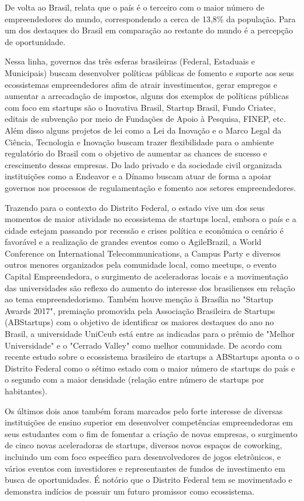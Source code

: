 De volta ao Brasil,  relata que o país é o terceiro com o maior número de empreendedores do mundo, correspondendo a cerca de 13,8\% da população. Para  um dos destaques do Brasil em comparação ao restante do mundo é a percepção de oportunidade.

Nessa linha, governos das três esferas brasileiras (Federal, Estaduais e Municipais) buscam desenvolver políticas públicas de fomento e suporte aos seus ecossistemas empreendedores afim de atrair investimentos, gerar empregos e aumentar a arrecadação de impostos, alguns dos exemplos de políticas públicas com foco em startups são o Inovativa Brasil, Startup Brasil, Fundo Criatec, editais de subvenção por meio de Fundações de Apoio à Pesquisa, FINEP, etc. Além disso alguns projetos de lei como a Lei da Inovação e o Marco Legal da Ciência, Tecnologia e Inovação buscam trazer flexibilidade para o ambiente regulatório do Brasil com o objetivo de aumentar as chances de sucesso e crescimento dessas empresas. Do lado privado e da sociedade civil organizada instituições como a Endeavor e a Dínamo buscam atuar de forma a apoiar governos nos processos de regulamentação e fomento aos setores empreendedores.

Trazendo para o contexto do Distrito Federal, o estado vive um dos seus momentos de maior atividade no ecossistema de startups local, embora o país e a cidade estejam passando por recessão e crises política e econômica o cenário é favorável e a realização de grandes eventos como o AgileBrazil, a World Conference on International Telecommunications, a Campus Party e diversos outros menores organizados pela comunidade local, como meetups, o evento Capital Empreendedora, o surgimento de aceleradoras locais e a movimentação das universidades são reflexo do aumento do interesse dos brasilienses em relação ao tema empreendedorismo. Também houve menção à Brasília no "Startup Awards 2017", premiação promovida pela Associação Brasileira de Startups (ABStartups) com o objetivo de identificar os maiores destaques do ano no Brasil, a universidade UniCeub está entre as indicadas para o prêmio de "Melhor Universidade" e o "Cerrado Valley" como melhor comunidade. De acordo com recente estudo sobre o ecossistema brasileiro de startups a ABStartups  aponta o o Distrito Federal como o sétimo estado com o maior número de startups do país e o segundo com a maior densidade (relação entre número de startups por habitantes). 

Os últimos dois anos também foram marcados pelo forte interesse de diversas instituições de ensino superior em desenvolver competências empreendedoras em seus estudantes com o fim de fomentar a criação de novas empresas, o surgimento de cinco novas aceleradoras de startups, diversos novos espaços de coworking, incluindo um com foco específico para desenvolvedores de jogos eletrônicos, e vários eventos com investidores e representantes de fundos de investimento em busca de oportunidades. É notório que o Distrito Federal tem se movimentado e demonstra indícios de possuir um futuro promissor como ecossistema.

